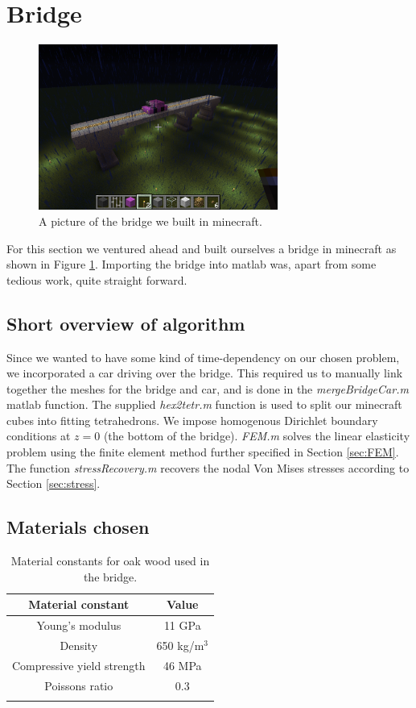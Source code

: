 \section{Bridge}

\begin{figure}
\center
\includegraphics[trim=0cm 5cm 7cm 7cm, clip=true, width=0.7\textwidth]{pic_bridge}
\caption{A picture of the bridge we built in minecraft.}
\label{fig:picBridge}
\end{figure}


For this section we ventured ahead and built ourselves a bridge in minecraft as shown in Figure \ref{fig:picBridge}. Importing the bridge into matlab was, apart from some tedious work, quite straight forward.


\subsection{Short overview of algorithm}
Since we wanted to have some kind of time-dependency on our chosen problem, we incorporated a car driving over the bridge. This required us to manually link together the meshes for the bridge and car, and is done in the \textit{mergeBridgeCar.m} matlab function. The supplied \textit{hex2tetr.m} function is used to split our minecraft cubes into fitting tetrahedrons. We impose homogenous Dirichlet boundary conditions at $z = 0$ (the bottom of the bridge). \textit{FEM.m} solves the linear elasticity problem using the finite element method further specified in Section \ref{sec:FEM}. The function \textit{stressRecovery.m} recovers the nodal Von Mises stresses according to Section \ref{sec:stress}.

\subsection{Materials chosen}
\begin{table}
\center
\caption{Material constants for oak wood used in the bridge.} 
\begin{tabular}{cc}
Material constant & Value \\ 
\hline \noalign{\smallskip}
Young's modulus & 11 GPa \\ 
Density & 650 kg/m$^3$ \\ 
Compressive yield strength & 46 MPa \\ 
Poissons ratio & 0.3 \\ 
\label{tab:oak}
\end{tabular}
\end{table}


